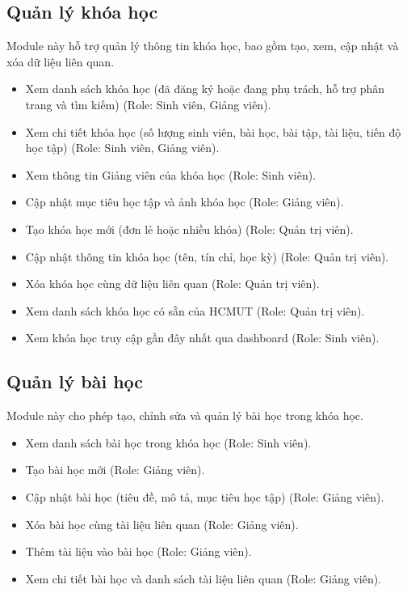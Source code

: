 \subsection{Quản lý khóa học}
Module này hỗ trợ quản lý thông tin khóa học, bao gồm tạo, xem, cập nhật và xóa dữ liệu liên quan.
\begin{itemize}[label=--]
    \item Xem danh sách khóa học (đã đăng ký hoặc đang phụ trách, hỗ trợ phân trang và tìm kiếm) (Role: Sinh viên, Giảng viên).
    \item Xem chi tiết khóa học (số lượng sinh viên, bài học, bài tập, tài liệu, tiến độ học tập) (Role: Sinh viên, Giảng viên).
    \item Xem thông tin Giảng viên của khóa học (Role: Sinh viên).
    \item Cập nhật mục tiêu học tập và ảnh khóa học (Role: Giảng viên).
    \item Tạo khóa học mới (đơn lẻ hoặc nhiều khóa) (Role: Quản trị viên).
    \item Cập nhật thông tin khóa học (tên, tín chỉ, học kỳ) (Role: Quản trị viên).
    \item Xóa khóa học cùng dữ liệu liên quan (Role: Quản trị viên).
    \item Xem danh sách khóa học có sẵn của HCMUT (Role: Quản trị viên).
    \item Xem khóa học truy cập gần đây nhất qua dashboard (Role: Sinh viên).
\end{itemize}

\subsection{Quản lý bài học}
Module này cho phép tạo, chỉnh sửa và quản lý bài học trong khóa học.
\begin{itemize}[label=--]
    \item Xem danh sách bài học trong khóa học (Role: Sinh viên).
    \item Tạo bài học mới (Role: Giảng viên).
    \item Cập nhật bài học (tiêu đề, mô tả, mục tiêu học tập) (Role: Giảng viên).
    \item Xóa bài học cùng tài liệu liên quan (Role: Giảng viên).
    \item Thêm tài liệu vào bài học (Role: Giảng viên).
    \item Xem chi tiết bài học và danh sách tài liệu liên quan (Role: Giảng viên).
\end{itemize}

